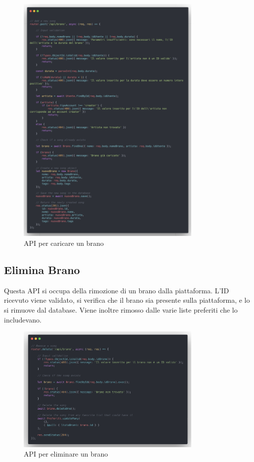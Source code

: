 \documentclass[a4paper,12pt]{article}
\begin{document}
\begin{figure}[htp]
    \centering
    \includegraphics[width=0.8\textwidth]{source-code/api-carica-brano.png}
    \caption{API per caricare un brano}
\end{figure}

\subsection{Elimina Brano}

Questa API si occupa della rimozione di un brano dalla piattaforma. L'ID ricevuto viene validato, si verifica che il brano sia presente sulla piattaforma, e lo si rimuove dal database. Viene inoltre rimosso dalle varie liste preferiti che lo includevano.

\begin{figure}[htp]
    \centering
    \includegraphics[width=0.8\textwidth]{source-code/api-elimina-brano.png}
    \caption{API per eliminare un brano}
\end{figure}
\end{document}

